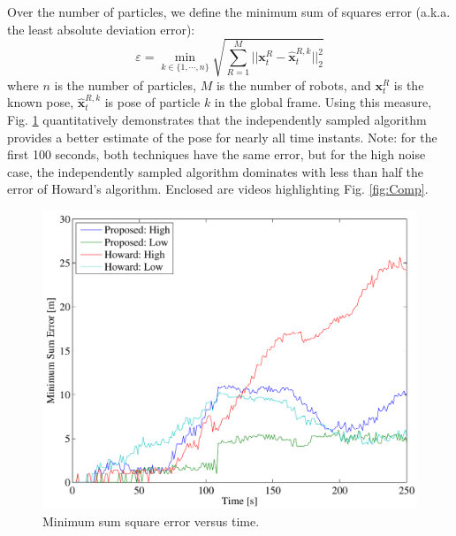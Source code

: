 Over the number of particles, we define the minimum sum of squares error (a.k.a. the least absolute deviation error):
\begin{equation}
\varepsilon=\min_{k\in\{1,\cdots,n\}}\sqrt{\sum_{R=1}^{M} ||\textbf{x}_{t}^R-\hat{\textbf{x}}^{R,k}_{t}||^2_2}
\end{equation}
where $n$ is the number of particles, $M$ is the number of robots, and $\textbf{x}_t^R$ is the known pose, $\hat{\textbf{x}}^{R,k}_{t}$ is pose of particle $k$ in the global frame.  Using this measure, Fig. \ref{fig:minsumerr} quantitatively demonstrates that the independently sampled algorithm provides a better estimate of the pose for nearly all time instants.  Note: for the first 100 seconds, both techniques have the same error, but for the high noise case, the independently sampled algorithm dominates with less than half the error of Howard's algorithm.  Enclosed are videos highlighting Fig. \ref{fig:Comp}.




\begin{figure}[h]
\centering
\includegraphics[width=\columnwidth]{../FinalFigures/MinSumError}
\caption{Minimum sum square error versus time.}
\label{fig:minsumerr}
\end{figure}